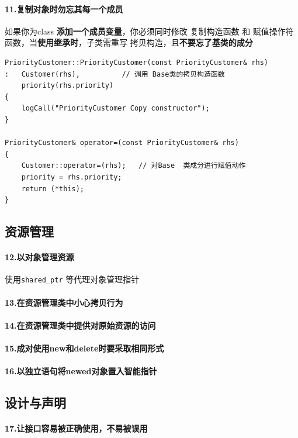 \documentclass[UTF8,a4paper,12pt]{ctexbook}
\begin{document}
		\paragraph{11.复制对象时勿忘其每一个成员} 如果你为class \textbf{添加一个成员变量}，你必须同时修改 复制构造函数 和 赋值操作符函数，当\textbf{使用继承时}，子类需重写 拷贝构造，且\textbf{不要忘了基类的成分}
		
			\begin{lstlisting}
PriorityCustomer::PriorityCustomer(const PriorityCustomer& rhs)
: 	Customer(rhs), 			// 调用 Base类的拷贝构造函数
	priority(rhs.priority)
{
	logCall("PriorityCustomer Copy constructor");
}

PriorityCustomer& operator=(const PriorityCustomer& rhs)
{
	Customer::operator=(rhs);  	// 对Base  类成分进行赋值动作
	priority = rhs.priority;
	return (*this);
}
			\end{lstlisting}
		

	\subsection{资源管理}
		\paragraph{12.以对象管理资源} 使用\verb|shared_ptr| 等代理对象管理指针
		\paragraph{13.在资源管理类中小心拷贝行为}
		\paragraph{14.在资源管理类中提供对原始资源的访问}
		\paragraph{15.成对使用new和delete时要采取相同形式}
		\paragraph{16.以独立语句将newed对象置入智能指针}
	\subsection{设计与声明}
		\paragraph{17.让接口容易被正确使用，不易被误用}
\end{document}
